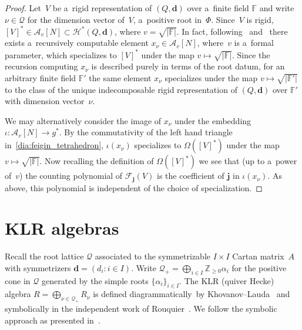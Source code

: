 \documentclass[pdftex]{sigma}
\numberwithin{equation}{section}
\begin{document}
\begin{proof}
Let~$V$ be a~rigid representation of $(Q,\mathbf{d})$ over a~f\/inite f\/ield $\mathbb{F}$ and write $\nu\in\mathcal{Q}$ for
the dimension vector of~$V$, a~positive root in~$\Phi$.
Since~$V$ is rigid, $[V]^*\in\mathcal{A}_v[N]\subset\mathcal{H}^*(Q,\mathbf{d})$, where $v=\sqrt{|\mathbb{F}|}$.
In fact, following~\cite{chen-xiao} and~\cite{jiang-sheng-xiao} there exists a~recursively computable element
$x_\nu\in\mathcal{A}_v[N]$, where~$v$ is a~formal parameter, which specializes to $[V]^*$ under the map $v\mapsto\sqrt{|\mathbb{F}|}$.
Since the recursion computing $x_\nu$ is described purely in terms of the root datum, for an arbitrary f\/inite f\/ield
$\mathbb{F}'$ the same element $x_\nu$ specializes under the map $v\mapsto\sqrt{|\mathbb{F}'|}$ to the class of the
unique indecomposable rigid representation of $(Q,\mathbf{d})$ over $\mathbb{F}'$ with dimension vector~$\nu$.

We may alternatively consider the image of $x_\nu$ under the embedding $\iota:\mathcal{A}_v[N]\to g^*$.
By the commutativity of the left hand triangle in~\eqref{dia:feigin_tetrahedron}, $\iota(x_\nu)$ specializes to
$\Omega([V]^*)$ under the map $v\mapsto\sqrt{|\mathbb{F}|}$.
Now recalling the def\/inition of $\Omega([V]^*)$ we see that (up to a~power of~$v$) the counting polynomial of
$\mathcal{F}_\mathbf{j}(V)$ is the coef\/f\/icient of $\mathbf{j}$ in $\iota(x_\nu)$.
As above, this polynomial is independent of the choice of specialization.
\end{proof}

\section{KLR algebras}\label{sec:KLR}

Recall the root lattice $\mathcal{Q}$ associated to the symmetrizable $I\times I$ Cartan matrix~$A$ with symmetri\-zers
$\mathbf{d}=(d_i: i\in I)$.
Write $\mathcal{Q}_+=\bigoplus\limits_{i\in I}\mathbb{Z}_{\ge0}\alpha_i$ for the positive cone in $\mathcal{Q}$
generated by the simple roots $\{\alpha_i\}_{i\in I}$.
The KLR (quiver Hecke) algebra $R=\bigoplus\limits_{\nu\in\mathcal{Q}_+} R_\nu$ is def\/ined diagrammatically~by
Khovanov--Lauda~\cite{khovanov-lauda1,khovanov-lauda2}
and symbolically in the independent work of
Rouquier~\cite{rouquier1,rouquier2}.
We follow the symbolic approach as presented in~\cite{kleshchev-ram2}.
\end{document}
